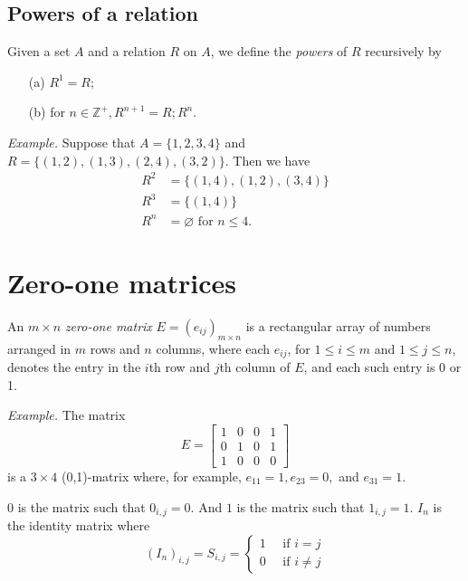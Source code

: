 \documentclass[11pt]{article}
\let\emptyset\varnothing
\begin{document}
    \subsection{Powers of a relation}

    Given a set $A$ and a relation $R$ on $A$, we define the \emph{powers} of $R$ recursively by 
    \begin{enumerate}
        \item[(a)] \(R^1 = R;\)
        \item[(b)] for \(n \in \mathbb{Z}^+, R^{n+1} = R;R^n.\)  
    \end{enumerate}

    \emph{Example.} Suppose that \(A = \{1,2,3,4\}\) and \(R = \{(1,2),(1,3),(2,4),(3,2)\}\). Then we have
    \begin{align*}
        R^2 &= \{(1,4),(1,2),(3,4)\} \\
        R^3 &= \{(1,4)\} \\
        R^n &= \emptyset \text{ for } n \leq 4.
    \end{align*}

    \section{Zero-one matrices}

    An \(m \times n\) \emph{zero-one matrix} \(E = (e_{ij})_{m \times n}\) is a rectangular array of numbers arranged in $m$ rows and $n$ columns, where each \(e_{ij}\), for \(1 \leq i \leq m\) and \(1 \leq j \leq n\), denotes the entry in the $i$th row and $j$th column of $E$, and each such entry is 0 or 1. 
    
    \vspace{1em}

    \emph{Example.} The matrix 
    \begin{equation*}
        E = \begin{bmatrix}
            1 & 0 & 0 & 1 \\
            0 & 1 & 0 & 1 \\
            1 & 0 & 0 & 0
        \end{bmatrix}
    \end{equation*}
    is a \(3 \times 4\) (0,1)-matrix where, for example, \(e_{11} = 1, e_{23} = 0,\) and \(e_{31} = 1.\)

    \vspace{1em}

    \(0\) is the matrix such that \(0_{i,j} = 0.\) And \(1\) is the matrix such that \(1_{i,j} = 1.\) \(I_n\) is the identity matrix where 
    \begin{equation*}
        (I_n)_{i,j} = S_{i,j} = \begin{cases}
            1 \quad \text{ if } i = j \\ 0 \quad \text{ if } i \neq j
        \end{cases}
    \end{equation*}
\end{document}

